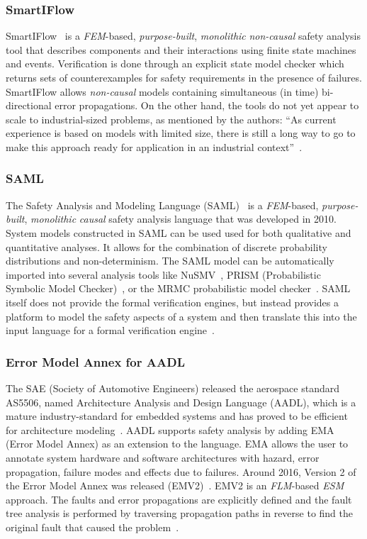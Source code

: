 \subsubsection{SmartIFlow}
SmartIFlow~\cite{info17:HaLuHo,honig2014new} is a {\em FEM}-based, {\em purpose-built}, {\em monolithic} {\em non-causal} safety analysis tool that describes components and their interactions using finite state machines and events. Verification is done through an explicit state model checker which returns sets of counterexamples for safety requirements in the presence of failures.  SmartIFlow allows {\em non-causal} models containing simultaneous (in time) bi-directional error propagations.  On the other hand, the tools do not yet appear to scale to industrial-sized problems, as mentioned by the authors: ``As current experience is based on models with limited size, there is still a long way to go to make this approach ready for application in an industrial context''~\cite{info17:HaLuHo}.

\subsubsection{SAML}
The Safety Analysis and Modeling Language (SAML)~\cite{Gudemann:2010:FQQ:1909626.1909813} is a {\em FEM}-based, {\em purpose-built}, {\em monolithic} {\em causal} safety analysis language that was developed in 2010.  System models constructed in SAML can be used used for both qualitative and quantitative analyses. It allows for the combination of discrete probability distributions and non-determinism. The SAML model can be automatically imported into several analysis tools like NuSMV~\cite{Cimatti2000}, PRISM (Probabilistic Symbolic Model Checker)~\cite{CAV2011:KwNoPa}, or the MRMC probabilistic model checker~\cite{Katoen:2005:MRM:1114692.1115230}. SAML itself does not provide the formal verification engines, but instead provides a platform to model the safety aspects of a system and then translate this into the input language for a formal verification engine~\cite{Gudemann:2010:FQQ:1909626.1909813}.

\subsubsection{Error Model Annex for AADL}
The SAE (Society of Automotive Engineers) released the
aerospace standard AS5506, named Architecture Analysis and Design Language (AADL), which is a mature industry-standard for embedded systems and has proved to be efficient for architecture modeling~\cite{aerospace2012sae,liu2016research}. AADL supports safety analysis by adding EMA (Error Model Annex) as an extension to the language. EMA allows the user to annotate system hardware and software architectures with hazard, error propagation, failure modes and effects due to failures. Around 2016, Version 2 of the Error Model Annex was released (EMV2)~\cite{EMV2}. EMV2 is an {\em FLM}-based {\em ESM} approach. The faults and error propagations are explicitly defined and the fault tree analysis is performed by traversing propagation paths in reverse to find the original fault that caused the problem~\cite{feiler2017automated}. 


